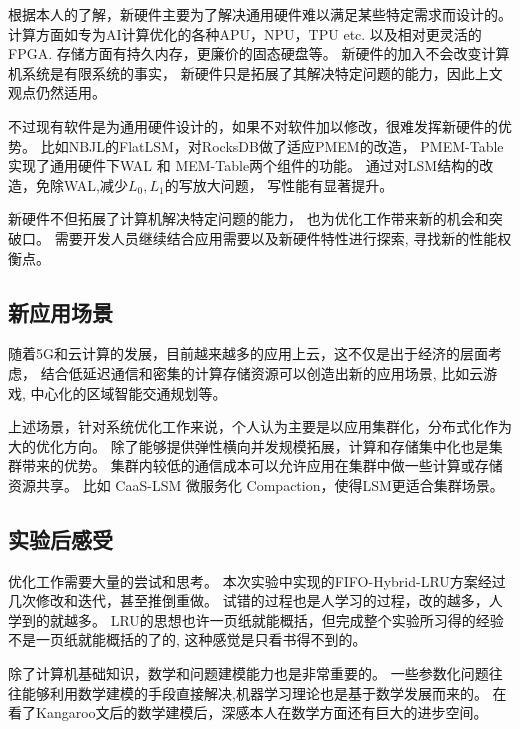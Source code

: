 根据本人的了解，新硬件主要为了解决通用硬件难以满足某些特定需求而设计的。
计算方面如专为AI计算优化的各种APU，NPU，TPU etc. 以及相对更灵活的FPGA.
存储方面有持久内存，更廉价的固态硬盘等。
新硬件的加入不会改变计算机系统是有限系统的事实，
新硬件只是拓展了其解决特定问题的能力，因此上文观点仍然适用。

不过现有软件是为通用硬件设计的，如果不对软件加以修改，很难发挥新硬件的优势。
比如NBJL的FlatLSM，对RocksDB做了适应PMEM的改造，
PMEM-Table实现了通用硬件下WAL 和 MEM-Table两个组件的功能。
通过对LSM结构的改造，免除WAL,减少$L_0, L_1$的写放大问题，
写性能有显著提升\cite{he_flatlsm_2023}。

新硬件不但拓展了计算机解决特定问题的能力，
也为优化工作带来新的机会和突破口。
需要开发人员继续结合应用需要以及新硬件特性进行探索, 寻找新的性能权衡点。

\subsection{新应用场景}

随着5G和云计算的发展，目前越来越多的应用上云，这不仅是出于经济的层面考虑，
结合低延迟通信和密集的计算存储资源可以创造出新的应用场景,
比如云游戏, 中心化的区域智能交通规划等。

上述场景，针对系统优化工作来说，个人认为主要是以应用集群化，分布式化作为大的优化方向。
除了能够提供弹性横向并发规模拓展，计算和存储集中化也是集群带来的优势。
集群内较低的通信成本可以允许应用在集群中做一些计算或存储资源共享。
比如 CaaS-LSM 微服务化 Compaction，使得LSM更适合集群场景\cite{qiaolin_yu_caas-lsm_2024}。

\subsection{实验后感受}

优化工作需要大量的尝试和思考。
本次实验中实现的FIFO-Hybrid-LRU方案经过几次修改和迭代，甚至推倒重做。
试错的过程也是人学习的过程，改的越多，人学到的就越多。
LRU的思想也许一页纸就能概括，但完成整个实验所习得的经验不是一页纸就能概括的了的,
这种感觉是只看书得不到的。

除了计算机基础知识，数学和问题建模能力也是非常重要的。
一些参数化问题往往能够利用数学建模的手段直接解决,机器学习理论也是基于数学发展而来的。
在看了Kangaroo文后的数学建模后，深感本人在数学方面还有巨大的进步空间。
